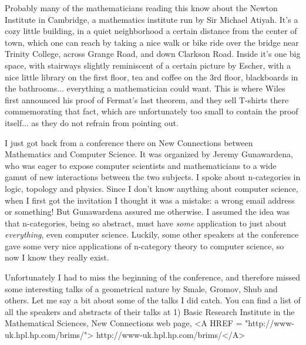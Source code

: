 


Probably many of the mathematicians reading this know about the Newton
Institute in Cambridge, a mathematics institute run by Sir Michael
Atiyah.  It's a cozy little building, in a quiet neighborhood a certain
distance from the center of town, which one can reach by taking a nice
walk or bike ride over the bridge near Trinity College, across Grange
Road, and down Clarkson Road.  Inside it's one big space, with stairways
slightly reminiscent of a certain picture by Escher, with a nice little
library on the first floor, tea and coffee on the 3rd floor, blackboards
in the bathrooms... everything a mathematician could want.  This is
where Wiles first announced his proof of Fermat's last theorem, and they
sell T-shirts there commemorating that fact, which are unfortunately too
small to contain the proof itself... as they do not refrain from
pointing out.  

I just got back from a conference there on New Connections between
Mathematics and Computer Science.  It was organized by Jeremy
Gunawardena, who was eager to expose computer scientists and
mathematicians to a wide gamut of new interactions between the two
subjects.  I spoke about n-categories in logic, topology and physics.
Since I don't know anything about computer science, when I first got the
invitation I thought it was a mistake: a wrong email address or
something!  But Gunawardena assured me otherwise.  I assumed the idea
was that n-categories, being so abstract, must have \emph{some} application
to just about \emph{everything}, even computer science.  Luckily, some other
speakers at the conference gave some very nice applications of
n-category theory to computer science, so now I know they really exist.




Unfortunately I had to miss the beginning of the conference, and
therefore missed some interesting talks of a geometrical nature by
Smale, Gromov, Shub and others.  Let me say a bit about some of the
talks I did catch.  You can find a list of all the speakers and abstracts 
of their talks at
1) Basic Research Institute in the Mathematical Sciences, 
New Connections web page, <A HREF = "http://www-uk.hpl.hp.com/brims/">
http://www-uk.hpl.hp.com/brims/</A>

